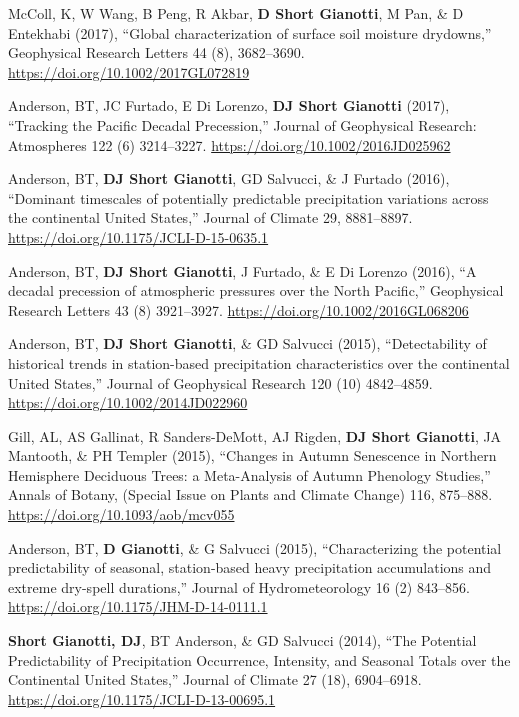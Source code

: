 \documentclass[10pt, a4paper]{article}
\newcommand{\lbr}{\vspace*{12pt}}
\newcommand{\years}[1]{\mbox{}\marginnote{\scriptsize #1}} %
\begin{document}
\years{2017b}McColl, K, W Wang, B Peng, R Akbar, \textbf{D Short Gianotti}, M Pan, \& D Entekhabi (2017), ``Global characterization of surface soil moisture drydowns,'' Geophysical Research Letters 44 (8), 3682--3690. \url{https://doi.org/10.1002/2017GL072819} \lbr

\years{2017a}Anderson, BT, JC Furtado, E Di Lorenzo, \textbf{DJ Short Gianotti} (2017), ``Tracking the Pacific Decadal Precession,'' Journal of Geophysical Research: Atmospheres 122 (6) 3214--3227. \url{https://doi.org/10.1002/2016JD025962} \lbr

\years{2016b}Anderson, BT, \textbf{DJ Short Gianotti}, GD Salvucci, \& J Furtado (2016), ``Dominant timescales of potentially predictable precipitation variations across the continental United States,'' Journal of Climate 29, 8881--8897. \url{https://doi.org/10.1175/JCLI-D-15-0635.1} \lbr

\years{2016a}Anderson, BT, \textbf{DJ Short Gianotti}, J Furtado, \& E Di Lorenzo (2016), ``A decadal precession of atmospheric pressures over the North Pacific,'' Geophysical Research Letters 43 (8) 3921--3927. \url{https://doi.org/10.1002/2016GL068206} \lbr

\years{2015c}Anderson, BT, \textbf{DJ Short Gianotti}, \& GD Salvucci (2015), ``Detectability of historical trends in station-based precipitation characteristics over the continental United States,'' Journal of Geophysical Research 120 (10) 4842--4859. \url{https://doi.org/10.1002/2014JD022960} \lbr

\years{2015b}Gill, AL, AS Gallinat, R Sanders-DeMott, AJ Rigden, \textbf{DJ Short Gianotti}, JA Mantooth, \& PH Templer (2015), ``Changes in Autumn Senescence in Northern Hemisphere Deciduous Trees: a Meta-Analysis of Autumn Phenology Studies,'' Annals of Botany, (Special Issue on Plants and Climate Change) 116, 875--888. \url{https://doi.org/10.1093/aob/mcv055} \lbr

\years{2015a}Anderson, BT, \textbf{D Gianotti}, \& G Salvucci (2015), ``Characterizing the potential predictability of seasonal, station-based heavy precipitation accumulations and extreme dry-spell durations,'' Journal of Hydrometeorology 16 (2) 843--856. \url{https://doi.org/10.1175/JHM-D-14-0111.1} \lbr

\years{2014a}\textbf{Short Gianotti, DJ}, BT Anderson, \& GD Salvucci (2014), ``The Potential Predictability of Precipitation Occurrence, Intensity, and Seasonal Totals over the Continental United States,'' Journal of Climate 27 (18), 6904--6918. \url{https://doi.org/10.1175/JCLI-D-13-00695.1} \lbr
\end{document}
